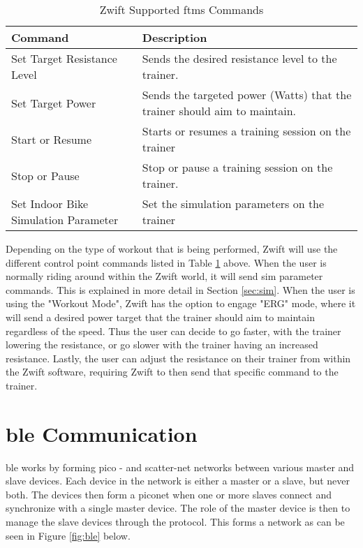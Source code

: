 \begin{table}[H]
	\renewcommand{\arraystretch}{1.5}
	\centering
	\caption{Zwift Supported \ac{ftms} Commands}
	\begin{tabularx}{0.8\textwidth}{ >{\raggedright}p{4cm} X}
		\toprule
		Command & Description\\
		\midrule
		Set Target Resistance Level & Sends the desired resistance level to the trainer.\\
		Set Target Power & Sends the targeted power (Watts) that the trainer should aim to maintain.\\
		Start or Resume & Starts or resumes a training session on the trainer\\
		Stop or Pause & Stop or pause a training session on the trainer.\\
		Set Indoor Bike Simulation Parameter & Set the simulation parameters on the trainer\\
		\bottomrule
	\end{tabularx}
	\label{tab:blreq}
\end{table}

Depending on the type of workout that is being performed, Zwift will use the different control point commands listed in Table \ref{tab:blreq} above. When the user is normally riding around within the Zwift world, it will send \ac{sim} parameter commands. This is explained in more detail in Section \ref{sec:sim}. When the user is using the "Workout Mode", Zwift has the option to engage "ERG" mode, where it will send a desired power target that the trainer should aim to maintain regardless of the speed. Thus the user can decide to go faster, with the trainer lowering the resistance, or go slower with the trainer having an increased resistance. Lastly, the user can adjust the resistance on their trainer from within the Zwift software, requiring Zwift to then send that specific command to the trainer. 
\newpage

\section{\ac{ble} Communication}
\label{sec:ble}
\ac{ble} works by forming pico - and scatter-net networks between various master and slave devices. Each device in the network is either a master or a slave, but never both. The devices then form a piconet when one or more slaves connect and synchronize with a single master device. The role of the master device is then to manage the slave devices through the protocol. This forms a network as can be seen in Figure \ref{fig:ble} below.\\

